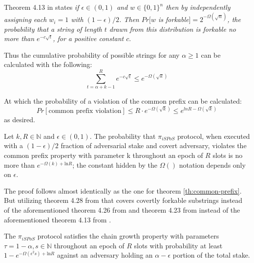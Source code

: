 Theorem 4.13 in \cite{ouroboros} states \emph{if $\epsilon \in (0,1)$ and $w \in \{0,1\}^n$ then by independently assigning each $w_i = 1$ with $(1-\epsilon)/2$. Then $Pr[w$ is forkable$]=2^{-\Omega(\sqrt{n})}$, the probability that a string of length $t$ drawn from this distribution is forkable no more than $e^{-c\sqrt{t}}$, for a positive constant $c$}.

Thus the cumulative probability of possible strings for any $\alpha \geq 1$ can be calculated with the following: 
\begin{equation}
\label{eq:com-pre-bound}
    \sum_{t=\alpha + k - 1}^{R} e^{-c \sqrt{t}} \leq e^{-\Omega(\sqrt{k})}
\end{equation}

At which the probability of a violation of the common prefix can be calculated: 
\begin{equation*}
    Pr[\text{common prefix violation}] \leq R \cdot e^{-\Omega(\sqrt{k})} \leq e^{ln R - \Omega(\sqrt{k})}
\end{equation*}
as desired.

\begin{theorem}
\label{th:comPrefix-covert}
    Let $k,R \in \mathbb{N}$ and $\epsilon \in (0,1)$. The probability that $\pi_{iSPoS}$ protocol, when executed with a $(1-\epsilon)/2$ fraction of adversarial stake and covert adversary, violates the common prefix property with parameter k throughout an epoch of $R$ slots is no more than $e^{-\Omega(k)+\text{ln} R}$; the constant hidden by the $\Omega()$ notation depends only on $\epsilon$.
\end{theorem}

The proof follows almost identically as the one for theorem \ref{th:common-prefix}. But utilizing theorem 4.28 from \cite{ouroboros} that covers covertly forkable substrings instead of the aforementioned theorem 4.26 from \cite{ouroboros} and theorem 4.23 from \cite{ouroboros} instead of the aforementioned theorem 4.13 from \cite{ouroboros}.

\begin{theorem}
    The $\pi_{iSPoS}$ protocol satisfies the chain growth property with parameters $\tau = 1- \alpha, s \in \mathbb{N}$ throughout an epoch of $R$ slots with probability at least $1 - e^{-\Omega(\epsilon^2s) +\text{ln} R}$ against an adversary holding an $\alpha - \epsilon$ portion of the total stake.
\end{theorem}

